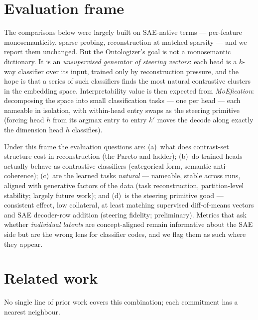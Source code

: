 \documentclass[11pt]{article}
\begin{document}
\section{Evaluation frame}

The comparisons below were largely built on SAE-native terms ---
per-feature monosemanticity, sparse probing, reconstruction at matched
sparsity --- and we report them unchanged. But the Ontologizer's goal is
not a monosemantic dictionary. It is an \emph{unsupervised generator of
steering vectors}: each head is a $k$-way classifier over its input,
trained only by reconstruction pressure, and the hope is that a series of
such classifiers finds the most natural contrastive clusters in the
embedding space. Interpretability value is then expected from
\emph{MoEfication}: decomposing the space into small classification tasks
--- one per head --- each nameable in isolation, with within-head entry
swaps as the steering primitive (forcing head $h$ from its argmax entry to
entry $k'$ moves the decode along exactly the dimension head $h$
classifies).

Under this frame the evaluation questions are: (a)~what does contrast-set
structure cost in reconstruction (the Pareto and ladder); (b)~do trained
heads actually behave as contrastive classifiers (categorical form,
semantic anti-coherence); (c)~are the learned tasks \emph{natural} ---
nameable, stable across runs, aligned with generative factors of the data
(task reconstruction, partition-level stability; largely future work);
and (d)~is the steering primitive good --- consistent effect, low
collateral, at least matching supervised diff-of-means vectors and SAE
decoder-row addition (steering fidelity; preliminary). Metrics that ask
whether \emph{individual latents} are concept-aligned remain informative
about the SAE side but are the wrong lens for classifier codes, and we
flag them as such where they appear.

\section{Related work}

No single line of prior work covers this combination; each commitment has
a nearest neighbour.
\end{document}
